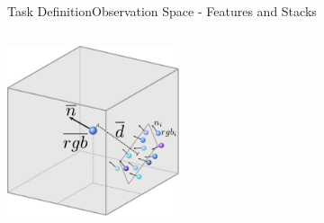 \begin{frame}{Task Definition}{Observation Space - Features and Stacks}
\begin{columns}
        \begin{column}{0.5\textwidth}%
            \centering
            \includegraphics[height=5cm]{graphics/octree_features_sketch.pdf}
        \end{column}
    \end{columns}
\end{frame}

